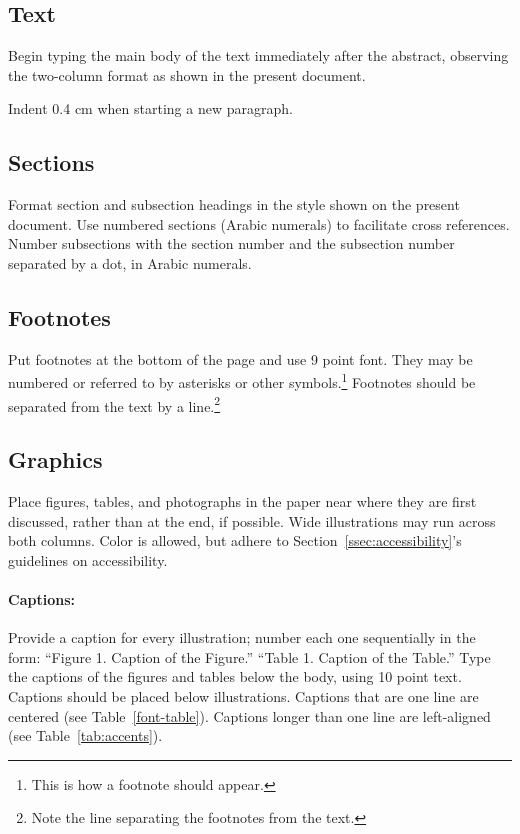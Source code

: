 \documentclass[11pt,a4paper]{article}
\begin{document}
\subsection{Text}
Begin typing the main body of the text immediately after the abstract, observing the two-column format as shown in the present document.

Indent 0.4 cm when starting a new paragraph.

\subsection{Sections}

Format section and subsection headings in the style shown on the present document.
Use numbered sections (Arabic numerals) to facilitate cross references.
Number subsections with the section number and the subsection number separated by a dot, in Arabic numerals.

\subsection{Footnotes}
Put footnotes at the bottom of the page and use 9 point font.
They may be numbered or referred to by asterisks or other symbols.\footnote{This is how a footnote should appear.}
Footnotes should be separated from the text by a line.\footnote{Note the line separating the footnotes from the text.}

\subsection{Graphics}

Place figures, tables, and photographs in the paper near where they are first discussed, rather than at the end, if possible.
Wide illustrations may run across both columns.
Color is allowed, but adhere to Section~\ref{ssec:accessibility}'s guidelines on accessibility.

\paragraph{Captions:}
Provide a caption for every illustration; number each one sequentially in the form:
``Figure 1. Caption of the Figure.''
``Table 1. Caption of the Table.''
Type the captions of the figures and tables below the body, using 10 point text.
Captions should be placed below illustrations.
Captions that are one line are centered (see Table~\ref{font-table}).
Captions longer than one line are left-aligned (see Table~\ref{tab:accents}).
\end{document}
